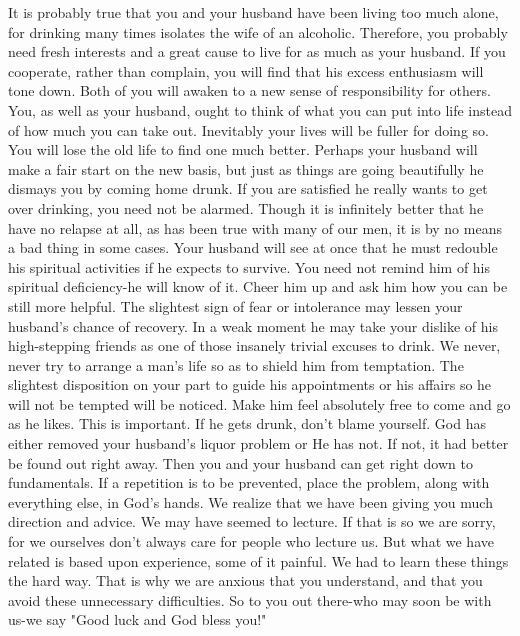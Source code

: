 \begin{biblechapter}
It is probably true that you and your husband have been living too much alone, for drinking many times isolates the wife of an alcoholic.  Therefore, you probably need fresh interests and a great cause to live for as much as your husband.  If you cooperate, rather than complain, you will find that his excess enthusiasm will tone down.  Both of you will awaken to a new sense of responsibility for others. You, as well as your husband, ought to think of what you can put into life instead of how much you can take out.  Inevitably your lives will be fuller for doing so.  You will lose the old life to find one much better.
Perhaps your husband will make a fair start on the new basis, but just as things are going beautifully he dismays you by coming home drunk.  If you are satisfied he really wants to get over drinking, you need not be alarmed.  Though it is infinitely better that he have no relapse at all, as has been true with many of our men, it is by no means a bad thing in some cases.  Your husband will see at once that he must redouble his spiritual activities if he expects to survive.  You need not remind him of his spiritual deficiency-he will know of it.  Cheer him up and ask him how you can be still more helpful.
The slightest sign of fear or intolerance may lessen your husband's chance of recovery.  In a weak moment he may take your dislike of his high-stepping friends as one of those insanely trivial excuses to drink.
We never, never try to arrange a man's life so as to shield him from temptation.  The slightest disposition on your part to guide his appointments or his affairs so he will not be tempted will be noticed.  Make him feel absolutely free to come and go as he likes.  This is important.  If he gets drunk, don't blame yourself.  God has either removed your husband's liquor problem or He has not.  If not, it had better be found out right away.  Then you and your husband can get right down to fundamentals.  If a repetition is to be prevented, place the problem, along with everything else, in God's hands.
We realize that we have been giving you much direction and advice.  We may have seemed to lecture.  If that is so we are sorry, for we ourselves don't always care for people who lecture us.  But what we have related is based upon experience, some of it painful.  We had to learn these things the hard way.  That is why we are anxious that you understand, and that you avoid these unnecessary difficulties. 
So to you out there-who may soon be with us-we say "Good luck and God bless you!"
\end{biblechapter}


